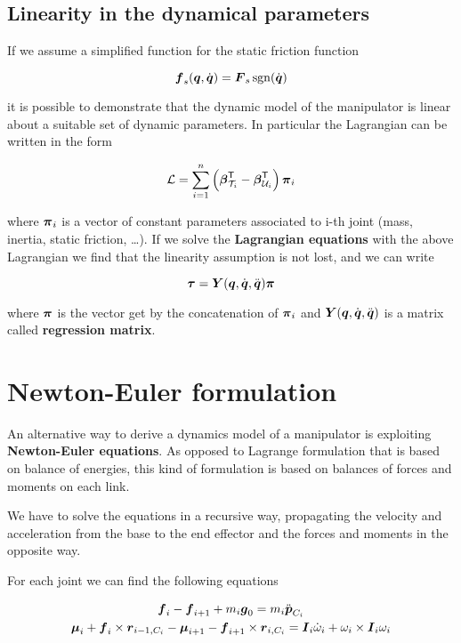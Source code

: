 \subsection{Linearity in the dynamical parameters}

If we assume a simplified function for the static friction function

\[
	\boldsymbol{f}_s(\boldsymbol{q},\dot{\boldsymbol{q}}) = \boldsymbol{F}_s\operatorname{sgn}(\dot{\boldsymbol{q}})
\]

it is possible to demonstrate that the  dynamic model of the manipulator is linear about a suitable set of dynamic parameters.
In particular the Lagrangian can be written in the form

\[
	\mathcal{L} = \sum_{i=1}^n \left( \boldsymbol{\beta}_{\mathcal{T}_i}^{\mathsf{T}} - \boldsymbol{\beta}_{\mathcal{U}_i}^{\mathsf{T}} \right) \boldsymbol{\pi}_i
\]

where $\boldsymbol{\pi}_i$ is a vector of constant parameters associated to i-th joint (mass, inertia, static friction, \dots).
If we solve the \textbf{Lagrangian equations} with the above Lagrangian we find that the linearity assumption is not lost, and we can write

\[
	\boldsymbol{\tau} = \boldsymbol{Y}(\boldsymbol{q},\dot{\boldsymbol{q}},\ddot{\boldsymbol{q}})\boldsymbol{\pi}
\]

where $\boldsymbol{\pi}$ is the vector get by the concatenation of $\boldsymbol{\pi}_i$ and $\boldsymbol{Y}(\boldsymbol{q},\dot{\boldsymbol{q}},\ddot{\boldsymbol{q}})$ is a matrix called \textbf{regression matrix}.


\section{Newton-Euler formulation}

An alternative way to derive a dynamics model of a manipulator is exploiting \textbf{Newton-Euler equations}.
As opposed to Lagrange formulation that is based on balance of energies, this kind of formulation is based on balances of forces and moments on each link.

We have to solve the equations in a recursive way, propagating the velocity and acceleration from the base to the end effector and the forces and moments in the opposite way.

For each joint we can find the following equations

\begin{gather*}
    \boldsymbol{f}_i - \boldsymbol{f}_{i+1} + m_i \boldsymbol{g}_0 = m_i \ddot{\boldsymbol{p}}_{C_i} \\
    \boldsymbol{\mu}_i + \boldsymbol{f}_i \times \boldsymbol{r}_{i-1,C_i} - \boldsymbol{\mu}_{i+1} - \boldsymbol{f}_{i+1} \times \boldsymbol{r}_{i,C_i} = \boldsymbol{I}_i \dot{\omega}_i + \omega_i \times \boldsymbol{I}_i \omega_i
\end{gather*}

